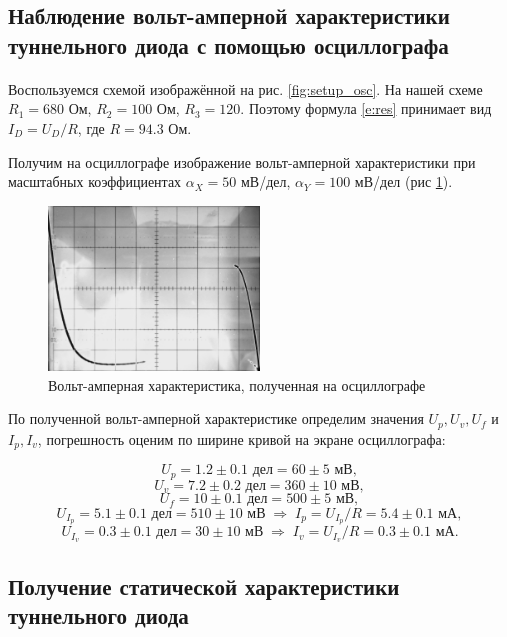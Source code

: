 \documentclass[a4paper,12pt]{article} %
\begin{document}
\subsection{Наблюдение вольт-амперной характеристики туннельного диода с помощью осциллографа}

\paragraph{}
	Воспользуемся схемой изображённой на рис. \ref{fig:setup_osc}. На нашей схеме $R_1 = 680$ Ом, $R_2 = 100$ Ом, $R_3 = 120$. Поэтому формула \eqref{e:res} принимает вид $I_D = U_D / R$, где $R = 94.3$ Ом.
	
	Получим на осциллографе изображение вольт-амперной характеристики при масштабных коэффициентах $\alpha_X = 50$ мВ/дел, $\alpha_Y = 100$ мВ/дел (рис \ref{fig:osc}).
	
	\begin{figure}[h]
	\centering
	\includegraphics[width=0.5\textwidth]{vac_osc.png}
	\caption{Вольт-амперная характеристика, полученная на осциллографе}
	\label{fig:osc}
	\end{figure}
	
	По полученной вольт-амперной характеристике определим значения $U_p, U_v, U_f$ и $I_p, I_v$, погрешность оценим по ширине кривой на экране осциллографа:
	
\[
U_p = 1.2 \pm 0.1 \text{ дел} = 60 \pm 5 \text{ мВ},
\]\[
U_v = 7.2 \pm 0.2 \text{ дел} = 360 \pm 10 \text{ мВ},
\]\[
U_f = 10 \pm 0.1 \text{ дел} = 500 \pm 5 \text{ мВ},
\]\[
U_{I_p} = 5.1 \pm 0.1 \text{ дел} = 510 \pm 10  \text{ мВ} \; \Rightarrow \; I_p = U_{I_p} / R = 5.4 \pm 0.1 \text{ мА},
\]\[
U_{I_v} = 0.3 \pm 0.1 \text{ дел} = 30 \pm 10  \text{ мВ} \; \Rightarrow \; I_v = U_{I_v} / R = 0.3 \pm 0.1 \text{ мА}.
\]
	
\subsection{Получение статической характеристики туннельного диода}
\end{document}
